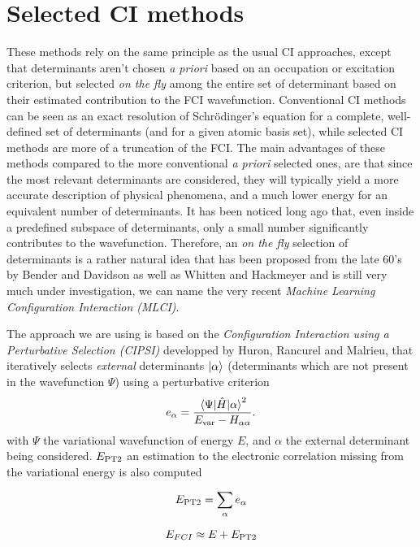 \documentclass[./thesis.tex]{subfiles}
\begin{document}
\section{Selected CI methods}

These methods rely on the same principle as the usual CI approaches, except that determinants aren't chosen \textit{a priori} based on an occupation or excitation criterion, but selected \emph{on the fly} among the entire set of determinant based on their estimated contribution to the FCI wavefunction. Conventional CI methods can be seen as an exact resolution of Schrödinger's equation for a complete, well-defined set of determinants (and for a given atomic basis set), while selected CI methods are more of a truncation of the FCI.
The main advantages of these methods compared to the more conventional \textit{a priori} selected ones, are that since the most relevant determinants are considered, they will typically yield a more accurate description of physical phenomena, and a much lower energy for an equivalent number of determinants.
It has been noticed long ago that, even inside a predefined subspace of determinants, only a small number significantly contributes to the wavefunction. Therefore, an \emph{on the fly} selection of determinants is a rather natural idea that has been proposed from the late 60's by Bender and Davidson\cite{Bender_1969} as well as Whitten and Hackmeyer\cite{Whitten_1969} and is still very much under investigation, we can name the very recent \emph{Machine Learning Configuration Interaction (MLCI)}.\cite{1808.05787}

The approach we are using is based on the \emph{Configuration Interaction using a Perturbative Selection (CIPSI)} developped by Huron, Rancurel and Malrieu,\cite{Huron_1973} that iteratively selects \emph{external} determinants ${\ket{\alpha}}$ (determinants which are not present in the wavefunction $\Psi$) using a perturbative criterion
\begin{equation}
e_\alpha = \frac{\mel{\Psi}{\hat{H}}{\alpha}^2}{E_\text{var} - H_{\alpha \alpha}}.
\end{equation}
with $\Psi$ the variational wavefunction of energy $E$, and $\alpha$ the external determinant being considered. $E_\text{PT2}$ an estimation to the electronic correlation missing from the variational energy is also computed


\begin{equation}
E_\text{PT2} = \sum_{\alpha} e_\alpha
\end{equation}

\begin{equation}
E_{FCI} \approx E + E_\text{PT2}
\end{equation}
\end{document}
